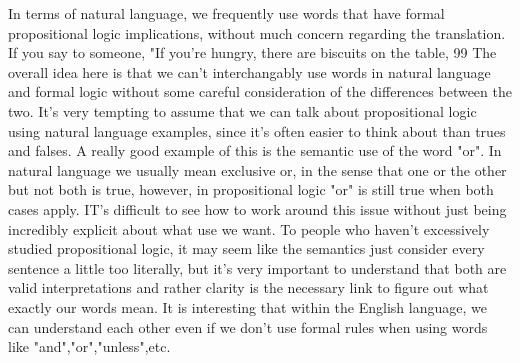 \documentclass[12pt]{article}
\newenvironment{problem}[2][Problem]{\begin{trivlist}
\item[\hskip \labelsep {\bfseries #1}\hskip \labelsep {\bfseries #2.}]}{\end{trivlist}}
\begin{document}
\begin{problem}{1}
\begin{enumerate}[label=\Alph*.]
In terms of natural language, we frequently use words that have formal propositional logic implications, without much concern regarding the translation. If you say to someone, "If you're hungry, there are biscuits on the table, 99%
The overall idea here is that we can't interchangably use words in natural language and formal logic without some careful consideration of the differences between the two. It's very tempting to assume that we can talk about propositional logic using natural language examples, since it's often easier to think about than trues and falses. A really good example of this is the semantic use of the word "or". In natural language we usually mean exclusive or, in the sense that one or the other but not both is true, however, in propositional logic "or" is still true when both cases apply. IT's difficult to see how to work around this issue without just being incredibly explicit about what use we want. To people who haven't excessively studied propositional logic, it may seem like the semantics just consider every sentence a little too literally, but it's very important to understand that both are valid interpretations and rather clarity is the necessary link to figure out what exactly our words mean. It is interesting that within the English language, we can understand each other even if we don't use formal rules when using words like "and","or","unless",etc.\\ 

\end{enumerate}

\end{problem}


\end{document}
